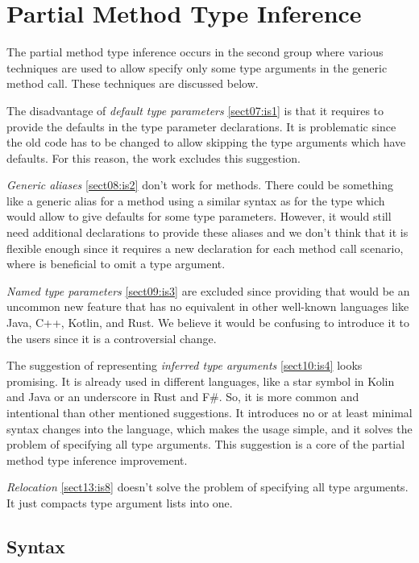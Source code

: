 \section{Partial Method Type Inference}

The partial method type inference occurs in the second group where various techniques are used to allow specify only some type arguments in the generic method call.
These techniques are discussed below.
\par
The disadvantage of \textit{default type parameters} \ref{sect07:is1} is that it requires to provide the defaults in the type parameter declarations.
It is problematic since the old code has to be changed to allow skipping the type arguments which have defaults.
For this reason, the work excludes this suggestion.
\par
\textit{Generic aliases} \ref{sect08:is2} don't work for methods.
There could be something like a generic alias for a method using a similar syntax as for the type which would allow to give defaults for some type parameters.
However, it would still need additional declarations to provide these aliases and we don't think that it is flexible enough since it requires a new declaration for each method call scenario, where is beneficial to omit a type argument.
\par
\textit{Named type parameters} \ref{sect09:is3} are excluded since providing that would be an uncommon new feature that has no equivalent in other well-known languages like Java, C++, Kotlin, and Rust. 
We believe it would be confusing to introduce it to the users since it is a controversial change.
\par
The suggestion of representing \textit{inferred type arguments} \ref{sect10:is4} looks promising.
It is already used in different languages, like a star symbol in Kolin and Java or an underscore in Rust and F\#. 
So, it is more common and intentional than other mentioned suggestions. 
It introduces no or at least minimal syntax changes into the language, which makes the usage simple, and it solves the problem of specifying all type arguments.
This suggestion is a core of the partial method type inference improvement.
\par
\textit{Relocation} \ref{sect13:is8} doesn’t solve the problem of specifying all type arguments. 
It just compacts type argument lists into one.

\subsection{Syntax}

